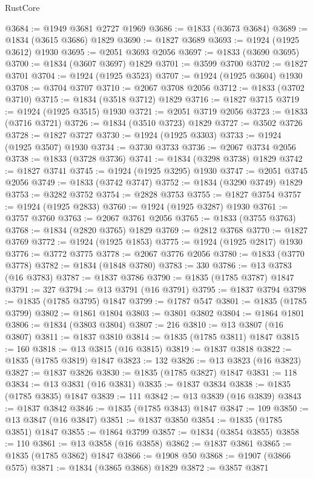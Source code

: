 \begin{lexlean}{RustCore}
\begin{coremodule}
@3684 := @1949 @3681 @2727 @1969
@3686 := @1833 (@3673 @3684)
@3689 := @1834 (@3615 @3686) @1829
@3690 := @1827 @3689
@3693 := @1924 (@1925 @3612) @1930
@3695 := @2051 @3693 @2056
@3697 := @1833 (@3690 @3695)
@3700 := @1834 (@3607 @3697) @1829
@3701 := @3599 @3700
@3702 := @1827 @3701
@3704 := @1924 (@1925 @3523)
@3707 := @1924 (@1925 @3604) @1930
@3708 := @3704 @3707
@3710 := @2067 @3708 @2056
@3712 := @1833 (@3702 @3710)
@3715 := @1834 (@3518 @3712) @1829
@3716 := @1827 @3715
@3719 := @1924 (@1925 @3515) @1930
@3721 := @2051 @3719 @2056
@3723 := @1833 (@3716 @3721)
@3726 := @1834 (@3510 @3723) @1829
@3727 := @3502 @3726
@3728 := @1827 @3727
@3730 := @1924 (@1925 @3303)
@3733 := @1924 (@1925 @3507) @1930
@3734 := @3730 @3733
@3736 := @2067 @3734 @2056
@3738 := @1833 (@3728 @3736)
@3741 := @1834 (@3298 @3738) @1829
@3742 := @1827 @3741
@3745 := @1924 (@1925 @3295) @1930
@3747 := @2051 @3745 @2056
@3749 := @1833 (@3742 @3747)
@3752 := @1834 (@3290 @3749) @1829
@3753 := @3282 @3752
@3754 := @2828 @3753
@3755 := @1827 @3754
@3757 := @1924 (@1925 @2833)
@3760 := @1924 (@1925 @3287) @1930
@3761 := @3757 @3760
@3763 := @2067 @3761 @2056
@3765 := @1833 (@3755 @3763)
@3768 := @1834 (@2820 @3765) @1829
@3769 := @2812 @3768
@3770 := @1827 @3769
@3772 := @1924 (@1925 @1853)
@3775 := @1924 (@1925 @2817) @1930
@3776 := @3772 @3775
@3778 := @2067 @3776 @2056
@3780 := @1833 (@3770 @3778)
@3782 := @1834 (@1848 @3780)
@3783 := 330
@3786 := @13 @3783 (@16 @3783)
@3787 := @1837 @3786
@3790 := @1835 (@1785 @3787) @1847
@3791 := 327
@3794 := @13 @3791 (@16 @3791)
@3795 := @1837 @3794
@3798 := @1835 (@1785 @3795) @1847
@3799 := @1787 @547
@3801 := @1835 (@1785 @3799)
@3802 := @1861 @1804
@3803 := @3801 @3802
@3804 := @1864 @1801
@3806 := @1834 (@3803 @3804)
@3807 := 216
@3810 := @13 @3807 (@16 @3807)
@3811 := @1837 @3810
@3814 := @1835 (@1785 @3811) @1847
@3815 := 160
@3818 := @13 @3815 (@16 @3815)
@3819 := @1837 @3818
@3822 := @1835 (@1785 @3819) @1847
@3823 := 132
@3826 := @13 @3823 (@16 @3823)
@3827 := @1837 @3826
@3830 := @1835 (@1785 @3827) @1847
@3831 := 118
@3834 := @13 @3831 (@16 @3831)
@3835 := @1837 @3834
@3838 := @1835 (@1785 @3835) @1847
@3839 := 111
@3842 := @13 @3839 (@16 @3839)
@3843 := @1837 @3842
@3846 := @1835 (@1785 @3843) @1847
@3847 := 109
@3850 := @13 @3847 (@16 @3847)
@3851 := @1837 @3850
@3854 := @1835 (@1785 @3851) @1847
@3855 := @1864 @3799
@3857 := @1834 (@3854 @3855)
@3858 := 110
@3861 := @13 @3858 (@16 @3858)
@3862 := @1837 @3861
@3865 := @1835 (@1785 @3862) @1847
@3866 := @1908 @50
@3868 := @1907 (@3866 @575)
@3871 := @1834 (@3865 @3868) @1829
@3872 := @3857 @3871

\end{coremodule}
\end{lexlean}
